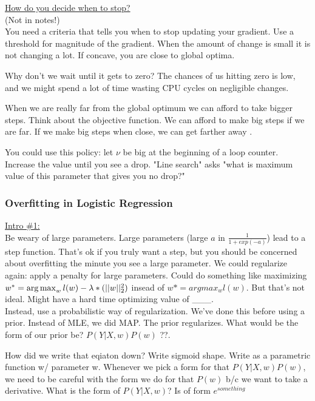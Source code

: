 \underline{How do you decide when to stop?} \hfill \\
(Not in notes!) \hfill \\

You need a criteria that tells you when to stop updating your gradient. 
	Use a threshold for magnitude of the gradient. 
	When the amount of change is small it is not changing a lot.  If concave, you are close to global optima. 

Why don't we wait until it gets to zero? 
	The chances of us hitting zero is low, and we might spend a lot of time wasting CPU cycles on negligible changes. 
	
When we are really far from the global optimum we can afford to take bigger steps. 
	Think about the objective function.  We can afford to make big steps if we are far.  
	If we make big steps when close, we can get farther away .

You could use this policy: let $\nu$ be big at the beginning of a loop counter. 
	Increase the value until you see a drop.
	"Line search" asks "what is maximum value of this parameter that gives you no drop?"  


\subsubsection{Overfitting in Logistic Regression}

 
 \underline{Intro \#1:}  \hfill \\
Be weary of large parameters.  %
	Large parameters (large $a$ in $\frac{1}{1 + exp(-a)}$) lead to a step function.  
	That's ok if you truly want a step, but you should be concerned about overfitting the minute you see a large parameter.
	We could regularize again: apply a penalty for large parameters. 
    	Could do something like maximizing $w^* = \operatorname*{arg\,max}_w l(w) - \lambda*(||w||_2^2)$ insead of $w* =  argmax_w l(w)$. 
	But that's not ideal.  Might have a hard time optimizing value of \_\_\_.  \hfill \\
	
Instead, use a probabilistic way of regularization.
	We've done this before using a prior.  Instead of MLE, we did MAP. The prior regularizes. 
	What would be the form of our prior be? 
	$P(Y|X,w)P(w)$ ??.
	
How did we write that eqiaton down?  Write sigmoid shape.  Write as a parametric function w/ parameter w. 
Whenever we pick a form for that $P(Y|X,w)P(w)$, we need to be careful with the form we do for that $P(w)$ b/c we want to take a derivative. 
What is the form of $P(Y|X,w)$?  Is of form $e^{something}$
 
